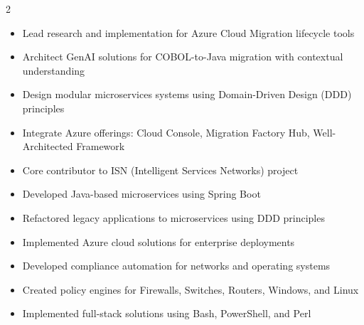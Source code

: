 \documentclass[10pt,a4paper,ragged2e,withhyper]{altacv}
\begin{document}
\makecvheader

\begin{paracol}{2}

\begin{itemize}
\item Lead research and implementation for Azure Cloud Migration lifecycle tools
\item Architect GenAI solutions for COBOL-to-Java migration with contextual understanding
\item Design modular microservices systems using Domain-Driven Design (DDD) principles
\item Integrate Azure offerings: Cloud Console, Migration Factory Hub, Well-Architected Framework
\end{itemize}
\divider

\begin{itemize}
\item Core contributor to ISN (Intelligent Services Networks) project
\item Developed Java-based microservices using Spring Boot
\item Refactored legacy applications to microservices using DDD principles
\item Implemented Azure cloud solutions for enterprise deployments
\end{itemize}
\divider

\begin{itemize}
\item Developed compliance automation for networks and operating systems
\item Created policy engines for Firewalls, Switches, Routers, Windows, and Linux
\item Implemented full-stack solutions using Bash, PowerShell, and Perl
\end{itemize}
\divider


\end{paracol}
\end{document}
